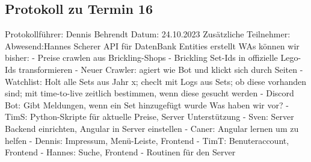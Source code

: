 \subsection{Protokoll zu Termin 16}
Protokollführer: Dennis Behrendt \newline
Datum: 24.10.2023 \newline
Zusätzliche Teilnehmer:\newline
Abwesend:Hannes Scherer \newline \newline
API für DatenBank Entities erstellt \newline
WAs können wir bisher:\newline
- Preise crawlen aus Brickling-Shops\newline
- Brickling Set-Ids in offizielle Lego-Ids transformieren\newline
- Neuer Crawler: agiert wie Bot und klickt sich durch Seiten \newline
- Watchlist: Holt alle Sets aus Jahr x; checlt mit Logs aus Sets; ob diese vorhanden sind; mit time-to-live zeitlich bestimmen, wenn diese gesucht werden
- Discord Bot: Gibt Meldungen, wenn ein Set hinzugefügt wurde
Was haben wir vor?\newline
- TimS: Python-Skripte für aktuelle Preise, Server Unterstützung \newline
- Sven: Server Backend einrichten, Angular in Server einstellen \newline
- Caner: Angular lernen um zu helfen \newline
- Dennis: Impressum, Menü-Leiste, Frontend \newline
- TimT: Benuteraccount, Frontend \newline
- Hannes: Suche, Frontend \newline
- Routinen für den Server\newline


